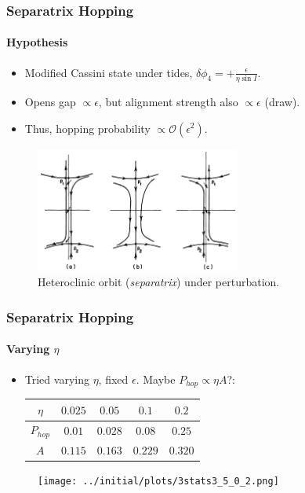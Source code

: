 \documentclass[dvipsnames]{beamer}
\begin{document}
\begin{frame}
    \frametitle{Separatrix Hopping}
    \framesubtitle{Hypothesis}

    \begin{itemize}
        \item Modified Cassini state under tides, $\delta \phi_4 =
            +\frac{\epsilon}{\eta \sin I}$.

        \item Opens gap $\propto \epsilon$, but alignment strength also $\propto
            \epsilon$ (draw).

        \item Thus, hopping probability $\propto \mathcal{O}(\epsilon^2)$.
    \end{itemize}
    \begin{figure}[t]
        \centering
        \includegraphics[width=0.6\textwidth]{plots/heteroclinic.png}
        \caption{Heteroclinic orbit (\emph{separatrix}) under perturbation.}
    \end{figure}
\end{frame}

\begin{frame}
    \frametitle{Separatrix Hopping}
    \framesubtitle{Varying $\eta$}

    \begin{itemize}
        \item Tried varying $\eta$, fixed $\epsilon$. Maybe $P_{hop} \propto
            \eta A$?:
            \begin{table}[t]
                \centering
                \begin{tabular}{c | c c c c}
                    $\eta$ & $0.025$ & $0.05$ & $0.1$ & $0.2$\\\midrule
                    $P_{hop}$ & $0.01$ & $0.028$ & $0.08$ & $0.25$\\\midrule
                    $A$ & $0.115$ & $0.163$ & $0.229$ & $0.320$
                \end{tabular}
            \end{table}
    \end{itemize}
    \begin{figure}[b]
        \centering
        \texttt{[image: ../initial/plots/3stats3\_5\_0\_2.png]}
    \end{figure}
\end{frame}
\end{document}
